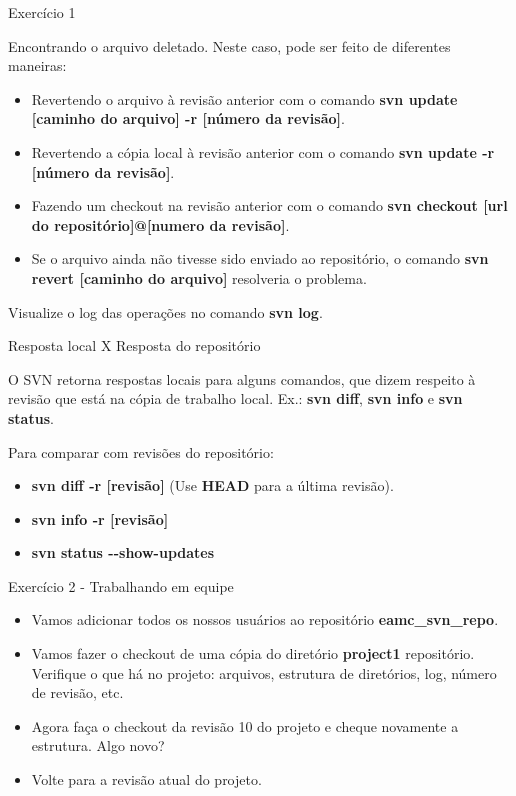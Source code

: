 \documentclass[a4paper]{beamer}
\begin{document}
\begin{frame}{Exercício 1}

Encontrando o arquivo deletado. Neste caso, pode ser feito de diferentes maneiras:
\begin{itemize}
\item Revertendo o arquivo à revisão anterior com o comando \textbf{svn update [caminho do arquivo] -r [número da revisão]}.
\item Revertendo a cópia local à revisão anterior com o comando \textbf{svn update -r [número da revisão]}.
\item Fazendo um checkout na revisão anterior com o comando \textbf{svn checkout [url do repositório]@[numero da revisão]}.
\item Se o arquivo ainda não tivesse sido enviado ao repositório, o comando \textbf{svn revert [caminho do arquivo]} resolveria o problema.
\end{itemize}

\pause
\vspace{10pt}
Visualize o log das operações no comando \textbf{svn log}.

\end{frame}

\begin{frame}{Resposta local X Resposta do repositório}

O SVN retorna respostas locais para alguns comandos, que dizem respeito à revisão que está na cópia de trabalho local. Ex.: \textbf{svn diff}, \textbf{svn info} e \textbf{svn status}.

Para comparar com revisões do repositório:
\begin{itemize}
\item \textbf{svn diff -r [revisão]} (Use \textbf{HEAD} para a última revisão).
\item \textbf{svn info -r [revisão]}
\item \textbf{svn status -{}-show-updates}
\end{itemize}

\end{frame}

\begin{frame}{Exercício 2 - Trabalhando em equipe}

\begin{itemize}[<+->]
\item Vamos adicionar todos os nossos usuários ao repositório \textbf{eamc\_svn\_repo}.
\item Vamos fazer o checkout de uma cópia do diretório \textbf{project1} repositório. Verifique o que há no projeto: arquivos, estrutura de diretórios, log, número de revisão, etc.
\item Agora faça o checkout da revisão 10 do projeto e cheque novamente a estrutura. Algo novo?
\item Volte para a revisão atual do projeto.
\end{itemize}

\end{frame}
\end{document}
